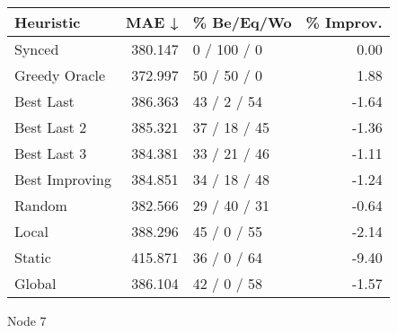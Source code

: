 \begin{tabular}{lrlr}
\toprule
\textbf{Heuristic} & \textbf{MAE ↓} & \textbf{\% Be/Eq/Wo} & \textbf{\% Improv.} \\
\midrule
            Synced &        380.147 &          0 / 100 / 0 &                0.00 \\
     Greedy Oracle &        372.997 &          50 / 50 / 0 &                1.88 \\
         Best Last &        386.363 &          43 / 2 / 54 &               -1.64 \\
       Best Last 2 &        385.321 &         37 / 18 / 45 &               -1.36 \\
       Best Last 3 &        384.381 &         33 / 21 / 46 &               -1.11 \\
    Best Improving &        384.851 &         34 / 18 / 48 &               -1.24 \\
            Random &        382.566 &         29 / 40 / 31 &               -0.64 \\
             Local &        388.296 &          45 / 0 / 55 &               -2.14 \\
            Static &        415.871 &          36 / 0 / 64 &               -9.40 \\
            Global &        386.104 &          42 / 0 / 58 &               -1.57 \\
\bottomrule
\end{tabular}
\caption{Node 7}
\label{tab:iid_lr05_le2_bs2_7}
